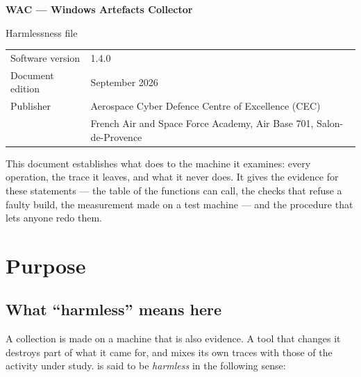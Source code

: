 \documentclass[11pt,a4paper,oneside]{report}
\begin{document}

\thispagestyle{empty}
\vspace*{\fill}
{\color{marine}\Large\bfseries WAC — Windows Artefacts Collector}\par
{\color{bleu}Harmlessness file}\par
\medskip
\begin{tabular}{@{}ll@{}}
Software version & 1.4.0 \\
Document edition & September 2026 \\
Publisher & Aerospace Cyber Defence Centre of Excellence (CEC) \\
          & French Air and Space Force Academy, Air Base 701, Salon-de-Provence \\
\end{tabular}

\bigskip
{\small\color{gris}This document establishes what \wac{} does to the machine
it examines: every operation, the trace it leaves, and what it never does. It
gives the evidence for these statements — the table of the functions
 can call, the checks that refuse a faulty build, the
measurement made on a test machine — and the procedure that lets anyone redo
them.}
\vspace*{2cm}
\clearpage

\tableofcontents

\chapter{Purpose}

\section{What ``harmless'' means here}

A collection is made on a machine that is also evidence. A tool that changes
it destroys part of what it came for, and mixes its own traces with those of
the activity under study. \wac{} is said to be \emph{harmless} in the
following sense:
\end{document}
